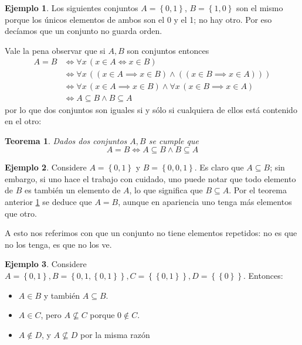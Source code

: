 \documentclass{book}
\newcommand{\set}[1]{\left\lbrace #1 \right\rbrace }
\newtheorem{thm}{Teorema}[chapter]
\theoremstyle{definition}
\newtheorem*{ejm}{Ejemplo}
\begin{document}
\begin{ejm}
	Los siguientes conjuntos $A=\set{0,1}$, $B=\set{1,0}$ son el mismo porque los únicos elementos de ambos son el 0 y el 1; no hay otro. Por eso decíamos que un conjunto no guarda orden.
\end{ejm}

Vale la pena observar que si $A,B$ son conjuntos entonces 
\begin{align*}
	A = B 
	&\iff \forall x\, \left(x\in A \iff x \in B\right)\\
	&\iff  \forall x\, \left( (x\in A \implies x \in B) \wedge ((x\in B \implies x \in A))\right) \\
	&\iff \forall x\, (x\in A \implies x \in B) \wedge \forall x\, (x\in B \implies x \in A)\\
	&\iff A \subseteq B \wedge B \subseteq A
\end{align*}
por lo que dos conjuntos son iguales si y sólo si cualquiera de ellos está contenido en el otro:
\begin{thm}\label{thm_igualdadConjuntos}
	Dados dos conjuntos $A,B$ se cumple que
	\[A = B \iff A \subseteq B \wedge B \subseteq A \]
\end{thm}

\begin{ejm}
	Considere $A = \set{0,1}$ y $B=\set{0,0,1}$. Es claro que $A \subseteq B$; sin embargo, si uno hace el trabajo con cuidado, uno puede notar que todo elemento de $B$ es también un elemento de $A$, lo que significa que $B \subseteq A$.
	Por el teorema anterior \ref{thm_igualdadConjuntos} se deduce que $A=B$, aunque en apariencia uno tenga más elementos que otro.
	
	A esto nos referimos con que un conjunto no tiene elementos repetidos: no es que no los tenga, es que no los ve.
\end{ejm}


\begin{ejm}
	Considere $A=\set{0,1}, B=\set{0,1,\set{0,1}}, C=\set{\set{0,1}}, D= \set{\set{0}}$. Entonces:
	\begin{itemize}
		\item $A\in B$ y también $A\subseteq B$.
		\item $A\in C$, pero $A \not \subseteq C$ porque $0 \notin C$.
		\item $A\notin D$, y $A\not \subseteq D$ por la misma razón
	\end{itemize}
\end{ejm}
\end{document}
